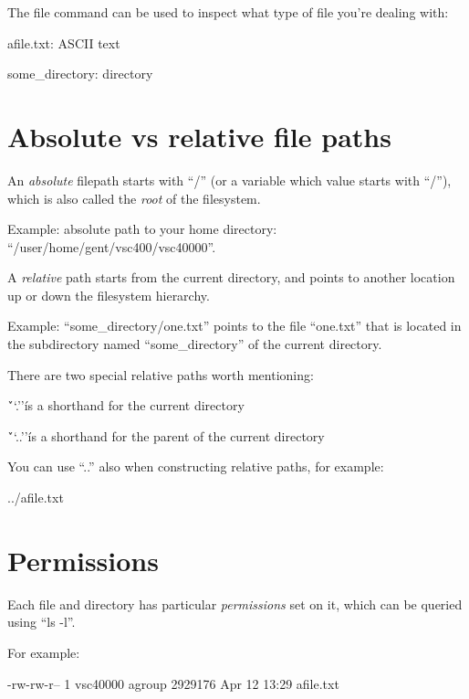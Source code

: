 The file command can be used to inspect what type of file you're dealing with:

\begin{prompt}
  afile.txt: ASCII text

  some_directory: directory
\end{prompt}

\section{Absolute vs relative file paths}

An \emph{absolute} filepath starts with ``/'' (or a variable which value starts
with ``/''), which is also called the \emph{root} of the filesystem.

Example: absolute path to your home directory: ``/user/home/gent/vsc400/vsc40000''.

A \emph{relative} path starts from the current directory, and points to another
location up or down the filesystem hierarchy.

Example: ``some_directory/one.txt'' points to the file ``one.txt'' that is
located in the subdirectory named ``some_directory'' of the current directory.

There are two special relative paths worth mentioning:

\item \'``.''\' is a shorthand for the current directory
\item \'``..''\' is a shorthand for the parent of the current directory

You can use ``..'' also when constructing relative paths, for example:

\begin{prompt}
  ../afile.txt
\end{prompt}

\section{Permissions}

Each file and directory has particular \emph{permissions} set on it, which can be queried using ``ls -l''.

For example:

\begin{prompt}
  -rw-rw-r-- 1 vsc40000 agroup 2929176 Apr 12 13:29 afile.txt
\end{prompt}

